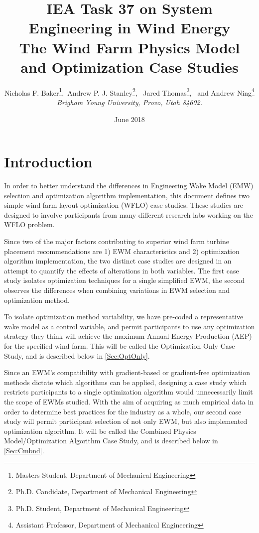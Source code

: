 \documentclass[12pt]{article}
\begin{document}
\title{IEA Task 37 on System Engineering in Wind Energy \\
\large The Wind Farm Physics Model and Optimization Case Studies}
\author{Nicholas F. Baker\thanks{Masters Student, Department of Mechanical Engineering},\  Andrew P. J. Stanley\thanks{Ph.D. Candidate, Department of Mechanical Engineering}, \ Jared Thomas\thanks{Ph.D. Student, Department of Mechanical Engineering}, \ and Andrew Ning\thanks{Assistant Professor, Department of Mechanical Engineering} \\
    {\normalsize\itshape Brigham Young University, Provo, Utah 84602.}\\
\date{June 2018}}

\maketitle{}
\vspace{-1cm}
\tableofcontents

\section{Introduction}
    In order to better understand the differences in Engineering Wake Model (EMW) selection and optimization algorithm implementation, this document defines two simple wind farm layout optimization (WFLO) case studies. These studies are designed to involve participants from many different research labs working on the WFLO problem.
    
    Since two of the major factors contributing to superior wind farm turbine placement recommendations are 1) EWM characteristics and 2) optimization algorithm implementation, the two distinct case studies are designed in an attempt to quantify the effects of alterations in both variables. The first case study isolates optimization techniques for a single simplified EWM, the second observes the differences when combining variations in EWM selection and optimization method.
    
    To isolate optimization method variability, we have pre-coded a representative wake model as a control variable, and permit participants to use any optimization strategy they think will achieve the maximum Annual Energy Production (AEP) for the specified wind farm. This will be called the Optimization Only Case Study, and is described below in \cref{Sec:OptOnly}.
    
    Since an EWM's compatibility with gradient-based or gradient-free optimization methods dictate which algorithms can be applied, designing a case study which restricts participants to a single optimization algorithm would unnecessarily limit the scope of EWMs studied. With the aim of acquiring as much empirical data in order to determine best practices for the industry as a whole, our second case study will permit participant selection of not only EWM, but also implemented optimization algorithm. It will be called the Combined Physics Model/Optimization Algorithm Case Study, and is described below in \cref{Sec:Cmbnd}.
    
\end{document}
